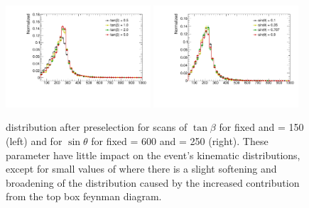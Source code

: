 \begin{figure}
\centering
\includegraphics[width=0.48\textwidth]{texinputs/04_grid/figures/monoz/leptonic/TanbScan_mA600_ma150_MET.pdf} 
\includegraphics[width=0.48\textwidth]{texinputs/04_grid/figures/monoz/leptonic/SinpScan_mA600_ma250_MET.pdf} 
\caption{\MET distribution after preselection for scans of $\tan{\beta}$ for fixed  \GeV and \ma = 150 \GeV (left) and for $\sin{\theta}$ for fixed \mA = 600 \GeV and \ma = 250 \GeV (right).  These parameter have little impact on the event's kinematic distributions, except for small values of \tanb where there is a slight softening and broadening of the \MET distribution caused by the increased contribution from the top box feynman diagram.}
\label{fig:monoz_kin_tanb_sintheta}
\end{figure}


